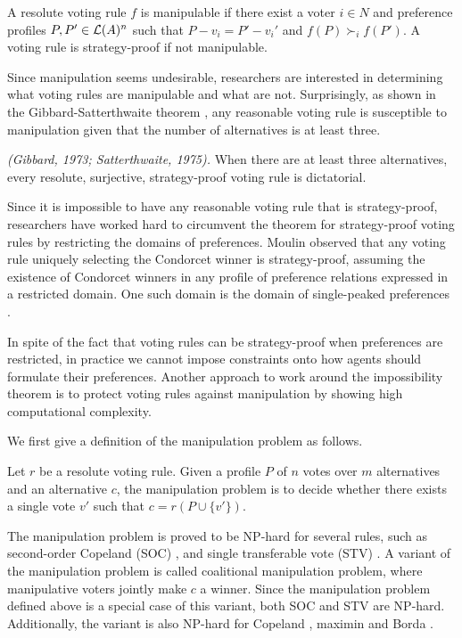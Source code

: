 \begin{definition}
	A resolute voting rule $f$ is manipulable if there exist
	a voter $i \in N$ and preference profiles $P,P' \in \mathcal{L}(A)^n$
	such that $P-v_i=P'-v_i'$ and $f(P) \succ_i f(P')$.
	A voting rule is strategy-proof if not manipulable.
\end{definition}

Since manipulation seems undesirable, researchers are
interested in determining what voting rules are
manipulable and what are not.
Surprisingly, as shown in the Gibbard-Satterthwaite
theorem \cite{gib:j:maip-scheme,satt:j:strat-proof},
any reasonable voting rule is susceptible to
manipulation given that the number of alternatives
is at least three.

\begin{thm}
\label{thm:Gib_Sat}
\emph{(Gibbard, 1973; Satterthwaite, 1975).}
	When there are at least three alternatives,
	every resolute, surjective, strategy-proof voting rule is
	dictatorial.
\end{thm}

Since it is impossible to have any reasonable voting rule that is strategy-proof,
researchers have worked hard to circumvent the theorem
for strategy-proof voting rules by restricting the domains
of preferences\cite{Brandt:COMSOC}.
Moulin \cite{Moul} observed that any voting rule uniquely selecting
the Condorcet winner is strategy-proof, assuming the existence
of Condorcet winners in any profile of preference relations
expressed in a restricted domain.
One such domain is the domain of single-peaked preferences
\cite{Sprumont}.

In spite of the fact that voting rules can be strategy-proof
when preferences are restricted, in practice we cannot impose
constraints onto how agents should formulate their preferences.
Another approach to work around the impossibility theorem is
to protect voting rules against manipulation by showing
high computational complexity.

We first give a definition of the manipulation problem as follows.
\begin{definition}
	Let $r$ be a resolute voting rule.  Given a profile $P$ of
	$n$ votes over $m$ alternatives and an alternative $c$, 
	the manipulation problem is to decide whether there exists
	a single vote $v'$ such that $c=r(P \cup \{v'\})$.
\end{definition}

The manipulation problem is proved to be NP-hard for several
rules, such as second-order Copeland (SOC) \cite{bartholdi:j:compdiff}, and
single transferable vote (STV) \cite{Bartholdi:STV}.
A variant of the manipulation problem is
called coalitional manipulation problem, where 
manipulative voters jointly make $c$ a winner.
Since the manipulation problem defined above is
a special case of this variant, both SOC and STV
are NP-hard.  Additionally, the variant is
also NP-hard for Copeland \cite{Faliszewski:Copeland},
maximin \cite{xia2009complexity} and Borda 
\cite{betzler2011unweighted,davies2011complexity}.

